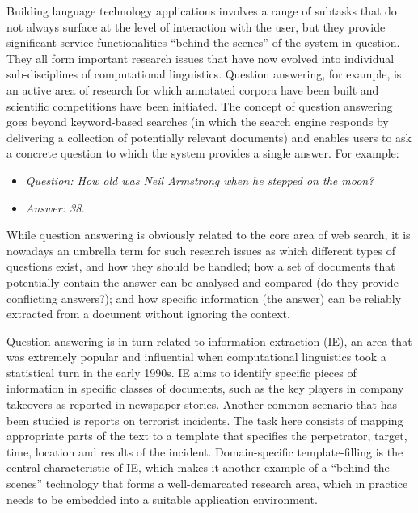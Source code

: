 \begin{multicols}{2}
Building language technology applications involves a range of subtasks that do not always surface at the level of interaction with the user, but they provide significant service functionalities “behind the scenes” of the system in question. They all form important research issues that have now evolved into individual sub-disciplines of computational linguistics.  Question answering, for example, is an active area of research for which annotated corpora have been built and scientific competitions have been initiated. The concept of question answering goes beyond keyword-based searches (in which the search engine responds by delivering a collection of potentially relevant documents) and enables users to ask a concrete question to which the system provides a single answer. For example:

\begin{itemize}
\item[] \textit{Question: How old was Neil Armstrong when he stepped on the moon?}
\item[] \textit{Answer: 38.}
\end{itemize}

While question answering is obviously related to the core area of web search, it is nowadays an umbrella term for such research issues as which different types of questions exist, and how they should be handled; how a set of documents that potentially contain the answer can be analysed and compared (do they provide conflicting answers?); and how specific information (the answer) can be reliably extracted from a document without ignoring the context. 


Question answering is in turn related to information extraction (IE), an area that was extremely popular and influential when computational linguistics took a statistical turn in the early 1990s. IE aims to identify specific pieces of information in specific classes of documents, such as the key players in company takeovers as reported in newspaper stories. Another common scenario that has been studied is reports on terrorist incidents. The task here consists of mapping appropriate parts of the text to a template that specifies the perpetrator, target, time, location and results of the incident. Domain-specific template-filling is the central characteristic of IE, which makes it another example of a “behind the scenes” technology that forms a well-demarcated research area, which in practice needs to be embedded into a suitable application environment. 


\end{multicols}
